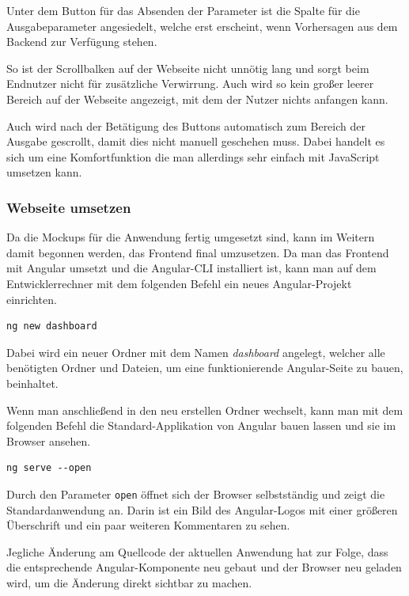 Unter dem Button für das Absenden der Parameter ist die Spalte für die Ausgabeparameter angesiedelt, welche erst
erscheint, wenn Vorhersagen aus dem Backend zur Verfügung stehen.

So ist der Scrollbalken auf der Webseite nicht unnötig lang und sorgt beim Endnutzer nicht für zusätzliche Verwirrung.
Auch wird so kein großer leerer Bereich auf der Webseite angezeigt, mit dem der Nutzer nichts anfangen kann.

Auch wird nach der Betätigung des Buttons automatisch zum Bereich der Ausgabe gescrollt, damit dies nicht manuell
geschehen muss. Dabei handelt es sich um eine Komfortfunktion die man allerdings sehr einfach mit JavaScript umsetzen
kann.

\subsubsection{Webseite umsetzen}
Da die Mockups für die Anwendung fertig umgesetzt sind, kann im Weitern damit begonnen werden, das Frontend final
umzusetzen. Da man das Frontend mit Angular umsetzt und die Angular-CLI installiert ist, kann man auf dem
Entwicklerrechner mit dem folgenden Befehl ein neues Angular-Projekt einrichten.

\begin{lstlisting}[caption=Einrichten eines neuen Angular-Projektes, label=ls:umsetzung_angular]
    ng new dashboard
\end{lstlisting}

Dabei wird ein neuer Ordner mit dem Namen \textit{dashboard} angelegt, welcher alle benötigten Ordner und Dateien, um
eine funktionierende Angular-Seite zu bauen, beinhaltet.

Wenn man anschließend in den neu erstellen Ordner wechselt, kann man mit dem folgenden Befehl die Standard-Applikation
von Angular bauen lassen und sie im Browser ansehen.

\begin{lstlisting}[caption=Bereitstellen der Angular-Webseite, label=ls:umsetzung_angularserve]
    ng serve --open
\end{lstlisting}

Durch den Parameter \texttt{open} öffnet sich der Browser selbstständig und zeigt die Standardanwendung an. Darin ist
ein Bild des Angular-Logos mit einer größeren Überschrift und ein paar weiteren Kommentaren zu sehen.

Jegliche Änderung am Quellcode der aktuellen Anwendung hat zur Folge, dass die entsprechende Angular-Komponente neu
gebaut und der Browser neu geladen wird, um die Änderung direkt sichtbar zu machen.

